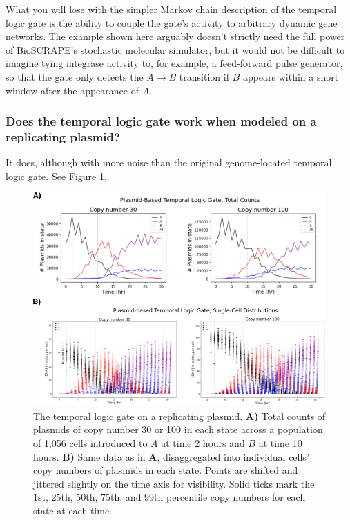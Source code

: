\documentclass[preprint,12pt]{oldplainarticle}
\begin{document}
What you will lose with the simpler Markov chain description of the temporal logic gate is the ability to couple the gate's activity to arbitrary dynamic gene networks. The example shown here arguably doesn't strictly need the full power of BioSCRAPE's stochastic molecular simulator, but it would not be difficult to imagine tying integrase activity to, for example, a feed-forward pulse generator, so that the gate only detects the $A\to B$ transition if $B$ appears within a short window after the appearance of $A$. 

\subsubsection{Does the temporal logic gate work when modeled on a replicating plasmid?}

It does, although with more noise than the original genome-located temporal logic gate. See Figure \ref{fig:tlg_results}. 

\begin{figure}[!ht]
\centering
\includegraphics[scale=2]{figures/TLG_results.png}
\caption{The temporal logic gate on a replicating plasmid. \textbf{A)} Total counts of plasmids of copy number 30 or 100 in each state across a population of 1,056 cells introduced to $A$ at time 2 hours and $B$ at time 10 hours. \textbf{B)} Same data as in \textbf{A}, disaggregated into individual cells' copy numbers of plasmids in each state. Points are shifted and jittered slightly on the time axis for visibility. Solid ticks mark the 1st, 25th, 50th, 75th, and 99th percentile copy numbers for each state at each time.}
\label{fig:tlg_results}
\end{figure}
\end{document}
